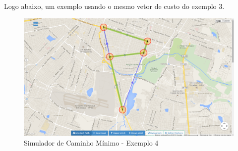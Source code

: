 Logo abaixo, um exemplo usando o mesmo vetor de custo do exemplo 3.

\begin{figure}[htbp]
\centering
 \includegraphics[width=.70\textwidth]{chapters/fig/validacao/ex4.png}
\caption{Simulador de Caminho Mínimo - Exemplo 4}
\label{fig:ex4}
\end{figure}
\FloatBarrier

